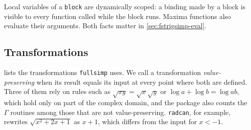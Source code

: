 \documentclass[11pt]{amsart}
\newcommand{\mx}{\lstinline[style=mx]}
\theoremstyle{definition}
\theoremstyle{remark}
\begin{document}
Local variables of a \mx|block| are dynamically scoped: a binding made by a
block is visible to every function called while the block runs. Maxima
functions also evaluate their arguments. Both facts matter in
\cref{sec:fstrigsimp-eval}.

\subsection{Transformations}

 lists the transformations \texttt{fullsimp} uses. We
call a transformation \emph{value-preserving} when its result equals its
input at every point where both are defined. Three of them rely on rules
such as $\sqrt{xy} = \sqrt{x}\sqrt{y}$ or $\log a + \log b = \log ab$, which
hold only on part of the complex domain, and the package also counts the
$\Gamma$ routines among those that are not value-preserving. \mx|radcan|, for
example, rewrites $\sqrt{x^2+2x+1}$ as $x+1$, which differs from the input
for $x < -1$.
\end{document}
